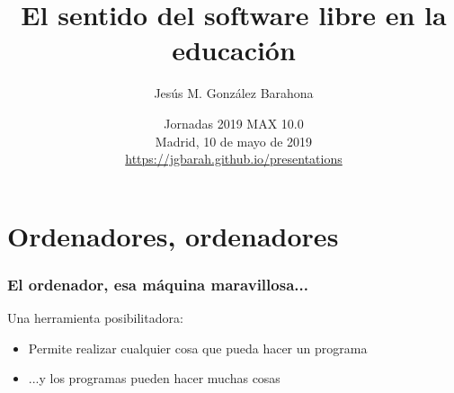 \documentclass[17pt,aspectratio=169]{beamer}
\renewcommand{\secimage}{figs/bookpages}
\newcommand{\secimage}{figs/bookpages}
\begin{document}
\title{El sentido del software libre en la educación}
\author{Jesús M. González Barahona}

\date{Jornadas 2019 MAX 10.0 \\
  Madrid, 10 de mayo de 2019 \\
{\small \url{https://jgbarah.github.io/presentations}} \\}

\frame{
\maketitle
}





\renewcommand{\secimage}{figs/ordenador-bebe}


\section{Ordenadores, ordenadores}



\begin{frame}
\frametitle{El ordenador, esa máquina maravillosa...}

Una herramienta posibilitadora:

\begin{itemize}
\item Permite realizar cualquier cosa que pueda hacer un programa
\item ...y los programas pueden hacer muchas cosas
\end{itemize}


\end{frame}
\end{document}
